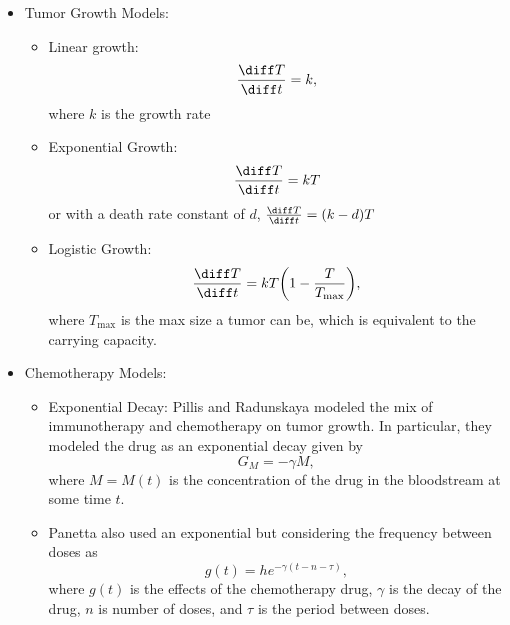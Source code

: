 \documentclass[11pt]{amsart}
\begin{document}
\begin{itemize}

	\item Tumor Growth Models:
		\begin{itemize}
	\item Linear growth: 
		\begin{equation}
			\frac{\diff T}{\diff t} = k,
			\label{eq: lin}
		\end{equation} 
		where $k$ is the growth rate
	\item Exponential Growth:
		\begin{equation}
			\frac{\diff T}{\diff t} = kT \label{eq: exp}
		\end{equation} 
	 or with a death rate constant of $d$, $\frac{\diff T}{\diff t} = (k-d)T$
	\item Logistic Growth: 
		\begin{equation} 
			\frac{\diff T}{\diff t} = kT \biggl(1- \frac{T}{T_{\max}}\biggr)\label{eq: logistic},
		\end{equation}
		where $T_{\max}$ is the max size a tumor can be, which is equivalent to the carrying capacity.
		\end{itemize}
		
	\item Chemotherapy Models: 
		\begin{itemize}
			\item Exponential Decay: Pillis and Radunskaya modeled the mix of immunotherapy and chemotherapy on tumor growth. In particular, they modeled the drug as an exponential decay given by 
				\begin{equation}
					G_M = -\gamma M \label{eq: Pillis},
				\end{equation}
				where $M=M(t)$ is the concentration of the drug in the bloodstream at some time $t$.
				
			\item Panetta also used an exponential but considering the frequency between doses as
				\begin{equation}
					g(t) = h e^{-\gamma(t-n-\tau)} \label{eq:PanettaExpDec},
				\end{equation}
				where $g(t)$ is the effects of the chemotherapy drug, $\gamma$ is the decay of the drug, $n$ is number of doses, and $\tau$ is the period between doses.
				

\end{itemize}
\end{itemize}
\end{document}
